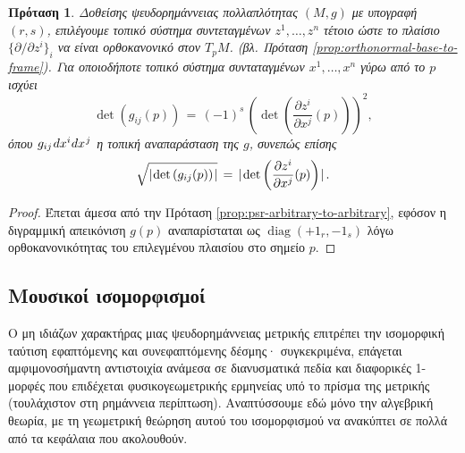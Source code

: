 \documentclass[11pt,a4paper,twoside,openright]{book}
\newtheorem{proposition}[lemma]{Πρόταση}
\begin{document}
\begin{proposition}\label{prop:orthonormal-to-arbitrary}
Δοθείσης ψευδορημάννειας πολλαπλότητας $(M, g)$ με υπογραφή $(r,s)$,
επιλέγουμε τοπικό σύστημα συντεταγμένων $z^1, \dots, z^n$
τέτοιο ώστε το πλαίσιο $\{\partial/\partial z^i\}_i$
να είναι ορθοκανονικό στον $Τ_pM$.
(βλ. Πρόταση \ref{prop:orthonormal-base-to-frame}).
Για οποιοδήποτε τοπικό σύστημα συνταταγμένων $x^1, \dots, x^n$
γύρω από το $p$ ισχύει
\begin{equation}\label{eq:orthonormal-to-arbitrary-quadratic}
\det \left(g_{ij}(p)\right)
\,
=
\,
(-1)^s
\,
\left(\det\left(\frac{\partial z^i}{\partial x^j}(p)\right)\right)^2,
\end{equation}
όπου $\hspace{.5pt}g_{ij}\hspace{.75pt}dx^i\hspace{.25pt}dx^{\hspace{.5pt}j}$
η τοπική αναπαράσταση της $g$, συνεπώς επίσης
\begin{equation}\label{eq:orthonormal-to-arbitrary-absolute}
\sqrt{\lvert\hspace{.75pt} \det \left(g_{ij}(p)\right) \hspace{.75pt}\rvert}
\,
=
\,
\lvert\hspace{1pt} \det\left(\frac{\partial z^i}{\partial x^j}(p)\right) \hspace{.5pt}\rvert\,.
\end{equation}
\end{proposition}
\begin{proof}
Έπεται άμεσα από την Πρόταση \ref{prop:psr-arbitrary-to-arbitrary},
εφόσον η διγραμμική απεικόνιση $g(p)$
αναπαρίσταται ως $\operatorname{diag}(+1_r, -1_s)$
λόγω ορθοκανονικότητας του επιλεγμένου πλαισίου στο σημείο $p$.
\end{proof}

\subsection{Μουσικοί ισομορφισμοί}

Ο μη ιδιάζων χαρακτήρας μιας ψευδορημάννειας μετρικής επιτρέπει
την ισομορφική ταύτιση εφαπτόμενης και συνεφαπτόμενης δέσμης·
συγκεκριμένα, επάγεται αμφιμονοσήμαντη αντιστοιχία
ανάμεσα σε διανυσματικά πεδία και διαφορικές 1-μορφές που
επιδέχεται φυσικογεωμετρικής ερμηνείας
υπό το πρίσμα της μετρικής (τουλάχιστον στη ρημάννεια περίπτωση).
Αναπτύσσουμε εδώ μόνο την αλγεβρική θεωρία,
με τη γεωμετρική θεώρηση αυτού του ισομορφισμού
να ανακύπτει σε πολλά από τα κεφάλαια που ακολουθούν.
\end{document}
